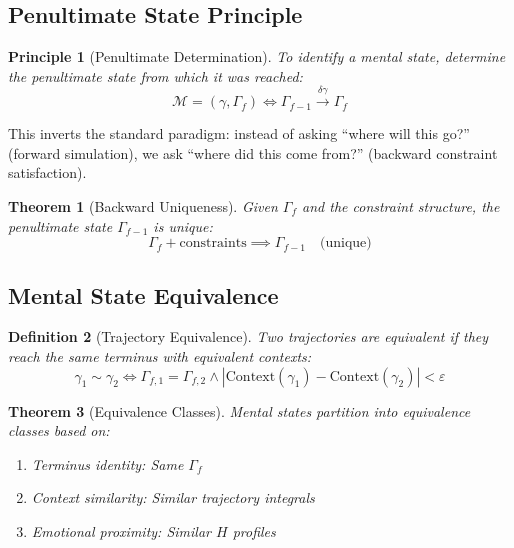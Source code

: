 \documentclass[twocolumn,amsmath,amssymb,aps,prl,superscriptaddress]{revtex4-2}
\newtheorem{theorem}{Theorem}[section]
\newtheorem{definition}[theorem]{Definition}
\newtheorem{principle}{Principle}
\newcommand{\Mstate}{\mathcal{M}}
\newcommand{\Hfield}{H}
\newcommand{\Gstate}{\Gamma}
\newcommand{\traj}{\gamma}
\begin{document}
\subsection{Penultimate State Principle}

\begin{principle}[Penultimate Determination]
To identify a mental state, determine the penultimate state from which it was reached:
\begin{equation}
\Mstate = (\traj, \Gstate_f) \iff \Gstate_{f-1} \xrightarrow{\delta\traj} \Gstate_f
\end{equation}
\end{principle}

This inverts the standard paradigm: instead of asking ``where will this go?'' (forward simulation), we ask ``where did this come from?'' (backward constraint satisfaction).

\begin{theorem}[Backward Uniqueness]
Given $\Gstate_f$ and the constraint structure, the penultimate state $\Gstate_{f-1}$ is unique:
\begin{equation}
\Gstate_f + \text{constraints} \implies \Gstate_{f-1} \quad \text{(unique)}
\end{equation}
\end{theorem}

\subsection{Mental State Equivalence}

\begin{definition}[Trajectory Equivalence]
Two trajectories are equivalent if they reach the same terminus with equivalent contexts:
\begin{equation}
\traj_1 \sim \traj_2 \iff \Gstate_{f,1} = \Gstate_{f,2} \land |\text{Context}(\traj_1) - \text{Context}(\traj_2)| < \varepsilon
\end{equation}
\end{definition}

\begin{theorem}[Equivalence Classes]
Mental states partition into equivalence classes based on:
\begin{enumerate}
\item Terminus identity: Same $\Gstate_f$
\item Context similarity: Similar trajectory integrals
\item Emotional proximity: Similar $\Hfield$ profiles
\end{enumerate}
\end{theorem}
\end{document}
